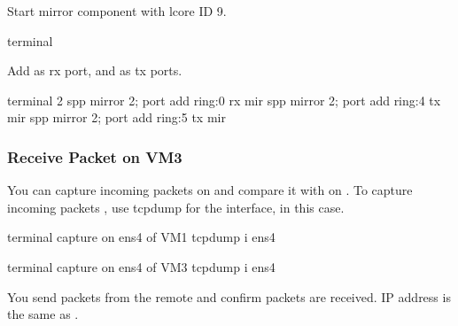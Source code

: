 \documentclass[a4paper,11pt,openany,oneside,english]{sphinxmanual}
\begin{document}
Start mirror component with lcore ID 9.

\begin{sphinxVerbatim}[commandchars=\\\{\},formatcom=\footnotesize]
 terminal 
\end{sphinxVerbatim}

Add  as rx port,  and  as tx ports.

\begin{sphinxVerbatim}[commandchars=\\\{\},formatcom=\footnotesize]
\PYGZsh{} terminal 2
spp \PYGZgt{} mirror 2; port add ring:0 rx mir
spp \PYGZgt{} mirror 2; port add ring:4 tx mir
spp \PYGZgt{} mirror 2; port add ring:5 tx mir
\end{sphinxVerbatim}


\subsubsection{Receive Packet on VM3}
\label{\detokenize{usecases/spp_mirror:receive-packet-on-vm3}}
You can capture incoming packets on  and compare it with on .
To capture incoming packets , use tcpdump for the interface,
 in this case.

\begin{sphinxVerbatim}[commandchars=\\\{\},formatcom=\footnotesize]
 terminal 
 capture on ens4 of VM1
 tcpdump \PYGZhy{}i ens4
\end{sphinxVerbatim}

\begin{sphinxVerbatim}[commandchars=\\\{\},formatcom=\footnotesize]
 terminal 
 capture on ens4 of VM3
 tcpdump \PYGZhy{}i ens4
\end{sphinxVerbatim}

You send packets from the remote  and confirm packets are received.
IP address is the same as {\hyperref[\detokenize{usecases/spp_vf:spp-usecases-vf}]{}}.
\end{document}
